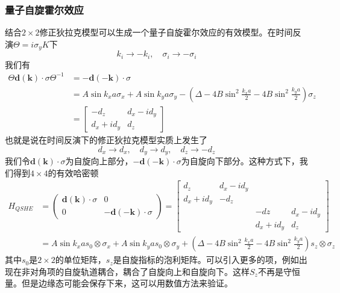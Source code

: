 \documentclass{article}
\numberwithin{equation}{subsection}
\begin{document}
\subsubsection{量子自旋霍尔效应}
结合$2\times2$修正狄拉克模型可以生成一个量子自旋霍尔效应的有效模型。在时间反演$\Theta=i\sigma_yK$下
\begin{equation}
    k_i\longrightarrow-k_i,\quad\sigma_i\longrightarrow-\sigma_i
\end{equation}
我们有
\begin{equation}
    \begin{split}
        \Theta\mathbf{d}(\mathbf{k})\cdot\sigma\Theta^{-1}&=-\mathbf{d}(-\mathbf{k})\cdot\sigma\\
        &=A\sin k_xa\sigma_x+A\sin k_ya\sigma_y-(\Delta-4B\sin^2\frac{k_xa}{2}-4B\sin^2\frac{k_ya}{2})\sigma_z\\
        &=\begin{bmatrix}
            -d_z&d_x-id_y\\
            d_x+id_y&d_z
        \end{bmatrix}
    \end{split}
\end{equation}
也就是说在时间反演下的修正狄拉克模型实质上发生了
\begin{equation}
    d_x\longrightarrow d_x,\quad d_y\longrightarrow d_y,\quad d_z\longrightarrow-d_z
\end{equation}
我们令$\mathbf{d}(\mathbf{k})\cdot\sigma$为自旋向上部分，$-\mathbf{d}(-\mathbf{k})\cdot\sigma$为自旋向下部分。这种方式下，我们得到$4\times4$的有效哈密顿
\begin{equation}
    \begin{split}
        H_{QSHE}&=\begin{pmatrix}
            \mathbf{d}(\mathbf{k})\cdot\sigma&0\\
            0&-\mathbf{d}(-\mathbf{k})\cdot\sigma
        \end{pmatrix}=\begin{bmatrix}
            d_z&d_x-id_y&\quad&\quad\\
            d_x+id_y&-d_z&\quad&\quad\\
            \quad&\quad&-dz&d_x-id_y\\
            \quad&\quad&d_x+id_y&d_z
        \end{bmatrix}\\
        &=A\sin k_xas_0\otimes \sigma_x+A\sin k_yas_0\otimes\sigma_y+\left(\Delta-4B\sin^2\frac{k_xa}{2}-4B\sin^2\frac{k_ya}{2}\right)s_z\otimes\sigma_z
    \end{split}
\end{equation}
其中$s_0$是$2\times2$的单位矩阵，$s_z$是自旋指标的泡利矩阵。可以引入更多的项，例如出现在非对角项的自旋轨道耦合，耦合了自旋向上和自旋向下。这样$S_z$不再是守恒量。但是边缘态可能会保存下来，这可以用数值方法来验证。
\end{document}
